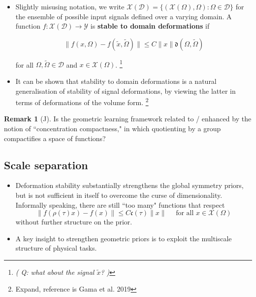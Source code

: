 \documentclass[12pt]{article}
\numberwithin{equation}{section}
\theoremstyle{definition}
\newtheorem{rmk}[thm]{Remark}
\newcommand{		\n		}	{	\noindent					} %
\newcommand{		\1		}	{	\bm{1}					}%
\begin{document}
\begin{itemize}
\item Slightly misusing notation, we write $\mathcal{X}(\mathcal{D}) = \{ (\mathcal{X}(\Omega), \Omega) : \Omega \in \mathcal{D} \}$ for the ensemble of possible input signals defined over a varying domain. A function $f : \mathcal{X}(\mathcal{D}) \to \mathcal{Y}$ is \textbf{stable to domain deformations} if

    $$
    \| f(x, \Omega) - f(\tilde{x}, \tilde{\Omega}) \| \leq C \| x \| \mathfrak{d} (\Omega, \tilde{\Omega}) 
    $$
    
    for all $\Omega, \tilde{\Omega} \in \mathcal{D}$ and $x \in \mathcal{X} (\Omega)$. \footnote{\emph{( Q: what about the signal $\tilde{x}$? )}}
    
    
\item It can be shown that stability to domain deformations is a natural generalisation of stability of signal deformations, by viewing the latter in terms of deformations of the volume form. \footnote{Expand, reference is Gama et al. 2019} 
    
    
\end{itemize}

\n\hrulefill

\begin{rmk}[J] Is the geometric learning framework related to / enhanced by the notion of ``concentration compactness," in which quotienting by a group compactifies a space of functions?
\end{rmk}

\n\hrulefill

\subsection{Scale separation}

\begin{itemize}
\item Deformation stability substantially strengthens the global symmetry priors, but is not sufficient in itself to overcome the curse of dimensionality. Informally speaking, there are still ``too many" functions that respect
    $$
    \| f( \rho(\tau) x ) - f(x) \| \leq C\mathfrak{c}(\tau) \|x \| \quad \text{ for all } x \in \mathcal{X} (\Omega) 
    $$
    without further structure on the prior. 
\item A key insight to strengthen geometric priors is to exploit the multiscale structure of physical tasks. 

\end{itemize}
\end{document}
